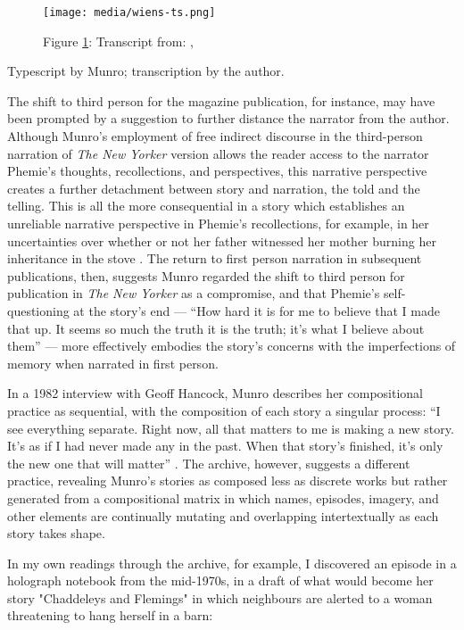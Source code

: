 \documentclass{article}
\begin{document}
\begin{figure}
    \centering
    \texttt{[image: media/wiens-ts.png]}
    \caption{Figure \ref{fig:wiens-ts}: Transcript from: \cite{munro_typescript_nodate}, }
    \label{fig:wiens-ts}
\end{figure}

Typescript by Munro; transcription by the author.

The shift to third person for the magazine publication, for instance, may have been prompted by a suggestion to further distance the narrator from the author. Although Munro's employment of free indirect discourse in the
third-person narration of \emph{The New Yorker} version allows the
reader access to the narrator Phemie's thoughts, recollections, and
perspectives, this narrative perspective creates a further detachment
between story and narration, the told and the telling. This is all the
more consequential in a story which establishes an unreliable narrative
perspective in Phemie's recollections, for example, in her uncertainties
over whether or not her father witnessed her mother burning her
inheritance in the stove \citep[28--29]{munro_progress_1986}. The return to first person narration in subsequent publications, then, suggests Munro regarded the
shift to third person for publication in \emph{The New Yorker} as a
compromise, and that Phemie's self-questioning at the story's
end –– ``How hard it is for me to believe that I made that up. It seems
so much the truth it is the truth; it's what I believe about them''
\citep[30]{munro_progress_1986} –– more effectively embodies the story's concerns with
the imperfections of memory when narrated in first person.

In a 1982 interview with Geoff Hancock, Munro describes her
compositional practice as sequential, with the composition of each story
a singular process: ``I see everything separate. Right now, all that
matters to me is making a new story. It's as if I had never made any in
the past. When that story's finished, it's only the new one that will
matter'' \citep[77]{hancock_interview_1982}. The archive, however, suggests a different
practice, revealing Munro's stories as composed less as discrete works
but rather generated from a compositional matrix in which names,
episodes, imagery, and other elements are continually mutating and
overlapping intertextually as each story takes shape. 

In my own readings through the archive, for example, I discovered an episode in a holograph notebook from the mid-1970s, in a draft of what would become her story "Chaddeleys and Flemings" in which neighbours are alerted to a woman threatening to hang herself in a barn:
\end{document}
